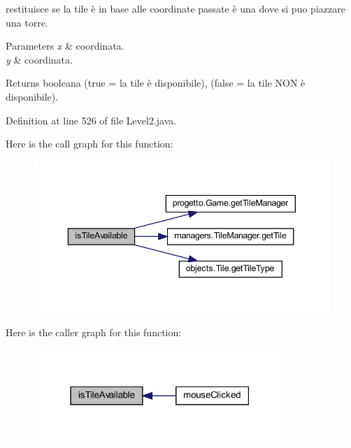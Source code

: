 restituisce se la tile è in base alle coordinate passate è una dove si puo piazzare una torre. 


\begin{DoxyParams}{Parameters}
{\em x} & coordinata. \\
\hline
{\em y} & coordinata.\\
\hline
\end{DoxyParams}
\begin{DoxyReturn}{Returns}
booleana (true = la tile è disponibile), (false = la tile N\+ON è disponibile). 
\end{DoxyReturn}


Definition at line 526 of file Level2.\+java.

Here is the call graph for this function\+:\nopagebreak
\begin{figure}[H]
\begin{center}
\leavevmode
\includegraphics[width=343pt]{classscenes_1_1_level2_aaeac2ee6b3a920a21928ee7b3dc8e7a9_cgraph}
\end{center}
\end{figure}
Here is the caller graph for this function\+:\nopagebreak
\begin{figure}[H]
\begin{center}
\leavevmode
\includegraphics[width=271pt]{classscenes_1_1_level2_aaeac2ee6b3a920a21928ee7b3dc8e7a9_icgraph}
\end{center}
\end{figure}
\mbox{\label{classscenes_1_1_level2_ab68417e6738c05037923f5f0f21eb586}} 
